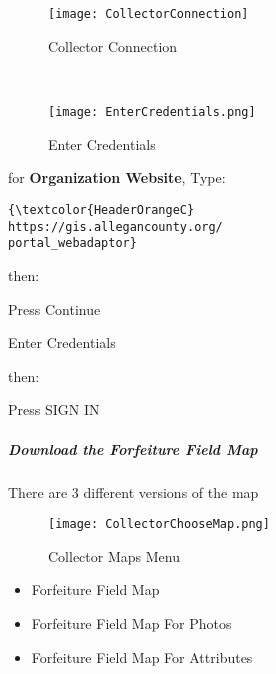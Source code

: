 \documentclass[class=book , crop=false, titlepage, twoside, multi={itemize, figure, verbatim}, float=false]{standalone}
\begin{document}
\subparagraph*{}
%
%
\begin{wrapfigure}{r}{0.5\textwidth}
\centering
\texttt{[image: CollectorConnection]}
\caption{Collector Connection}
\vspace{.25in}

\HRule \\[.4cm] %
\vspace{.25in}

\texttt{[image: EnterCredentials.png]}
\caption{Enter Credentials}
\end{wrapfigure}
for \textbf{Organization Website}, Type:
\vspace{.5in}

\begin{verbatim}
{\textcolor{HeaderOrangeC}
https://gis.allegancounty.org/
portal_webadaptor}

\end{verbatim}
\large then:
\vspace{.5in}

\noindent Press \Large Continue
\vspace{1.5in}

\noindent Enter Credentials
\vspace{.5in}

\noindent \large then:
\vspace{.5in}

\noindent Press \Large SIGN IN
\clearpage
%
%
%
\subparagraph[Download the Forfeiture Field Map]{Download the Forfeiture Field Map \texorpdfstring{\\}{}}
%
\noindent There are 3 different versions of the map
%
%
\begin{wrapfigure}{r}{0.5\textwidth}
\centering
\texttt{[image: CollectorChooseMap.png]}
\caption{Collector Maps Menu}
\end{wrapfigure}
\begin{itemize}
\item Forfeiture Field Map
\item Forfeiture Field Map For Photos
\item Forfeiture Field Map For Attributes
\end{itemize}

\vspace{.2in}
\end{document}
